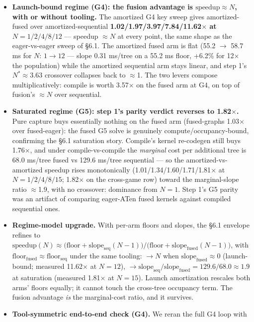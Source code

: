 \documentclass[11pt]{article}
\begin{document}
\begin{itemize}
\item \textbf{Launch-bound regime (G4): the fusion advantage is $\text{speedup} \approx
N$, with or without tooling.} The amortized G4 key sweep gives amortized-fused over
amortized-sequential \textbf{1.02/1.97/3.97/7.84/11.62$\times$ at $N = 1/2/4/8/12$} ---
speedup $\approx N$ at every point, the same shape as the eager-vs-eager sweep of
\S6.1. The amortized fused arm is flat (55.2 $\to$ 58.7 ms for $N{:}\,1{\to}12$ ---
slope 0.31 ms/tree on a 55.2 ms floor, +6.2\% for 12$\times$ the population) while the
amortized sequential arm stays linear, and step 1's $N^*\!\approx\!3.63$ crossover
collapses back to $\approx$1. The two levers compose multiplicatively: compile is worth
3.57$\times$ on the fused arm at G4, on top of fusion's $\approx N$ over sequential.
\item \textbf{Saturated regime (G5): step 1's parity verdict reverses to 1.82$\times$.}
Pure capture buys essentially nothing on the fused arm (fused-graphs 1.03$\times$ over
fused-eager): the fused G5 solve is genuinely compute/occupancy-bound, confirming the
\S6.1 saturation story. Compile's kernel re-codegen still buys 1.76$\times$, and under
compile-vs-compile the \emph{marginal} cost per additional tree is 68.0 ms/tree fused
vs 129.6 ms/tree sequential --- so the amortized-vs-amortized speedup rises
monotonically (1.01/1.34/1.60/1.71/1.81$\times$ at $N = 1/2/4/8/15$; 1.82$\times$ on
the cross-game row) toward the marginal-slope ratio $\approx$1.9, with no crossover:
dominance from $N{=}1$. Step 1's G5 parity was an artifact of comparing eager-ATen
fused kernels against compiled sequential ones.
\item \textbf{Regime-model upgrade.} With per-arm floors and slopes, the \S6.1 envelope
refines to $\text{speedup}(N) \approx \big(\text{floor} +
\text{slope}_{\text{seq}}(N{-}1)\big) / \big(\text{floor} +
\text{slope}_{\text{fused}}(N{-}1)\big)$, with $\text{floor}_{\text{fused}} \approx
\text{floor}_{\text{seq}}$ under the same tooling: $\to N$ when
$\text{slope}_{\text{fused}} \approx 0$ (launch-bound; measured 11.62$\times$ at
$N{=}12$), $\to \text{slope}_{\text{seq}}/\text{slope}_{\text{fused}} = 129.6/68.0
\approx 1.9$ at saturation (measured 1.81$\times$ at $N{=}15$). Launch amortization
rescales both arms' floors equally; it cannot touch the cross-tree occupancy term. The
fusion advantage \emph{is} the marginal-cost ratio, and it survives.
\item \textbf{Tool-symmetric end-to-end check (G4).} We reran the full G4 loop with

\end{itemize}
\end{document}
